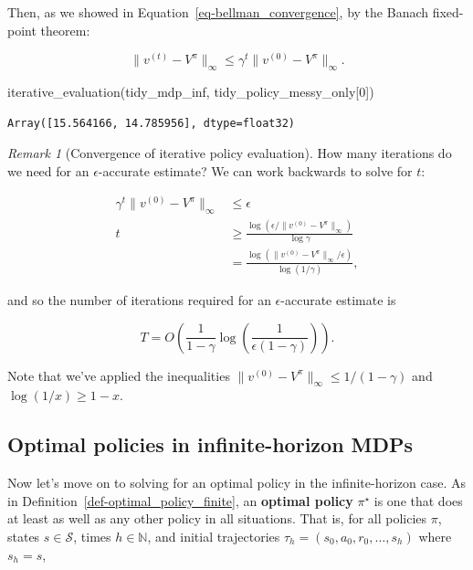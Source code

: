\documentclass[
  letterpaper,
  DIV=11,
  numbers=noendperiod]{scrreprt}
\newenvironment{Shaded}{\begin{snugshade}}{\end{snugshade}}
\newcommand{\DecValTok}[1]{\textcolor[rgb]{0.68,0.00,0.00}{#1}}
\newcommand{\NormalTok}[1]{\textcolor[rgb]{0.00,0.23,0.31}{#1}}
\theoremstyle{plain}
\theoremstyle{plain}
\theoremstyle{definition}
\theoremstyle{definition}
\theoremstyle{remark}
\newtheorem{refremark}{Remark}[chapter]
\begin{document}
Then, as we showed in Equation~\ref{eq-bellman_convergence}, by the
Banach fixed-point theorem:

\[\|v^{(t)} - V^\pi \|_{\infty} \le \gamma^{t} \| v^{(0)} - V^\pi\|_{\infty}.\]

\begin{Shaded}
\begin{Highlighting}[]
\NormalTok{iterative\_evaluation(tidy\_mdp\_inf, tidy\_policy\_messy\_only[}\DecValTok{0}\NormalTok{])}
\end{Highlighting}
\end{Shaded}

\begin{verbatim}
Array([15.564166, 14.785956], dtype=float32)
\end{verbatim}

\begin{refremark}[Convergence of iterative policy evaluation]
How many iterations do we need for an \(\epsilon\)-accurate estimate? We
can work backwards to solve for \(t\):

\[
\begin{aligned}
    \gamma^t \|v^{(0)} - V^\pi\|_{\infty} &\le \epsilon \\
    t &\ge \frac{\log (\epsilon / \|v^{(0)} - V^\pi\|_{\infty})}{\log \gamma} \\
    &= \frac{\log (\|v^{(0)} - V^\pi\|_{\infty} / \epsilon)}{\log (1 / \gamma)},
\end{aligned}
\]

and so the number of iterations required for an \(\epsilon\)-accurate
estimate is

\[
T = O\left( \frac{1}{1-\gamma} \log\left(\frac{1}{\epsilon (1-\gamma)}\right) \right).
\]

Note that we've applied the inequalities
\(\|v^{(0)} - V^\pi\|_{\infty} \le 1/(1-\gamma)\) and
\(\log (1/x) \ge 1-x\).

\label{rem-iterations_vi}

\end{refremark}

\subsection{Optimal policies in infinite-horizon
MDPs}\label{optimal-policies-in-infinite-horizon-mdps}

Now let's move on to solving for an optimal policy in the
infinite-horizon case. As in Definition~\ref{def-optimal_policy_finite},
an \textbf{optimal policy} \(\pi^\star\) is one that does at least as
well as any other policy in all situations. That is, for all policies
\(\pi\), states \(s \in \mathcal{S}\), times \(h\in \mathbb{N}\), and
initial trajectories \(\tau_h= (s_0, a_0, r_0, \dots, s_h)\) where
\(s_h= s\),
\end{document}
